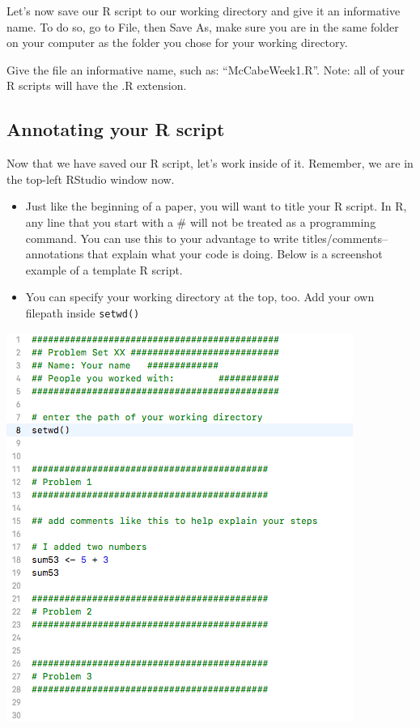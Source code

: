 \documentclass[
  letterpaper,
  DIV=11,
  numbers=noendperiod]{scrreprt}
\providecommand{\tightlist}{%
  \setlength{\itemsep}{0pt}\setlength{\parskip}{0pt}}\usepackage{longtable,booktabs,array}
\begin{document}
Let's now save our R script to our working directory and give it an
informative name. To do so, go to File, then Save As, make sure you are
in the same folder on your computer as the folder you chose for your
working directory.

Give the file an informative name, such as: ``McCabeWeek1.R''. Note: all
of your R scripts will have the .R extension.

\hypertarget{annotating-your-r-script}{%
\subsection{Annotating your R script}\label{annotating-your-r-script}}

Now that we have saved our R script, let's work inside of it. Remember,
we are in the top-left RStudio window now.

\begin{itemize}
\tightlist
\item
  Just like the beginning of a paper, you will want to title your R
  script. In R, any line that you start with a \# will not be treated as
  a programming command. You can use this to your advantage to write
  titles/comments-- annotations that explain what your code is doing.
  Below is a screenshot example of a template R script.
\item
  You can specify your working directory at the top, too. Add your own
  filepath inside \texttt{setwd()}
\end{itemize}

\includegraphics{images/templateR.png}
\end{document}
